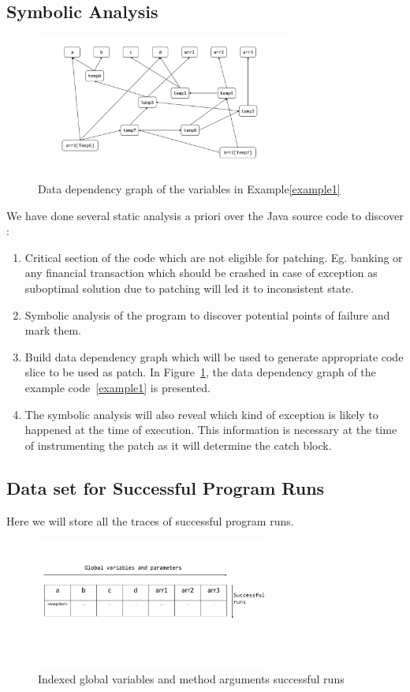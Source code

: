 \documentclass{sigplanconf}
\begin{document}
\subsection{Symbolic Analysis}
\label{subsec:symb}


\begin{figure}[!htb]
\centering
\includegraphics[width=3.3in]{images/depG.pdf}
\caption{Data dependency graph of the variables in Example\ref{example1}}
\label{fig:datadep}
\end{figure}

We have done several  static analysis a priori  over the Java source code to discover :
\begin{enumerate}
	\item Critical section of the code which are not eligible for patching. Eg. banking or any financial transaction which should be crashed in case of 
	exception as suboptimal solution due to patching will led it to inconsistent state.
	\item Symbolic analysis of the program to discover potential points of failure and mark them.
	\item Build data dependency graph which will be used to generate appropriate code slice to be used as patch. 
	In Figure~\ref{fig:datadep}, the data dependency graph of the example code~\ref{example1} is presented.
	\item The symbolic analysis will also reveal which kind of exception is likely to happened at the time of execution. 
	This information is necessary at the time of instrumenting the patch as it will determine the catch block.
	
\end{enumerate}

\subsection{Data set for Successful Program Runs}
\label{subsec:progrun}

Here we will store all the traces of successful program runs.
\begin{figure}[!htb]
\centering
\includegraphics[width=3.0in]{images/succrun.pdf}
\caption{Indexed global variables and method arguments successful runs}
\label{fig:succrun}
\end{figure}
\end{document}
